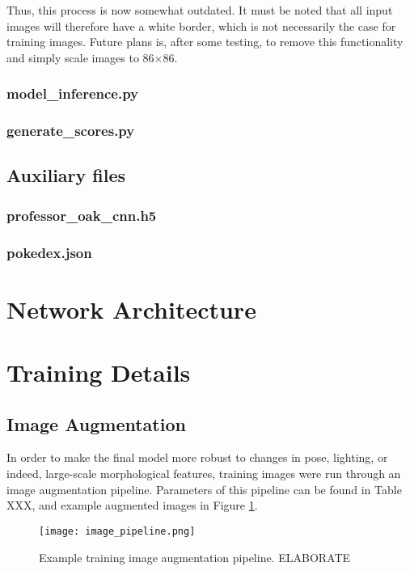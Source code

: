 \documentclass[onecolumn]{article}
\begin{document}
Thus, this process is now somewhat outdated. It must be noted that all input images will therefore have a white border, which is not necessarily the case for training images. Future plans is, after some testing, to remove this functionality and simply scale images to 86$\times$86.

\subsubsection*{model\_inference.py}

\subsubsection*{generate\_scores.py}

\subsection*{Auxiliary files}

\subsubsection*{professor\_oak\_cnn.h5}

\subsubsection*{pokedex.json}

\section*{Network Architecture}

\section*{Training Details}

\subsection*{Image Augmentation}

In order to make the final model more robust to changes in pose, lighting, or indeed, large-scale morphological features, training images were run through an image augmentation pipeline. Parameters of this pipeline can be found in Table XXX, and example augmented images in Figure \ref{ImagePipeline}.

\begin{figure}
\centering
	\texttt{[image: image\_pipeline.png]}
	\caption{Example training image augmentation pipeline. ELABORATE}
	\label{ImagePipeline}
\end{figure} 
\end{document}

